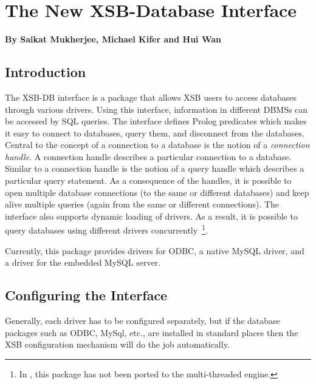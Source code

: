 
\chapter{The New XSB-Database Interface} \label{db_interface}

\begin{center}
{\Large {\bf By Saikat Mukherjee, Michael Kifer and Hui Wan }}
\end{center}

\section{Introduction}

The XSB-DB interface is a package that allows XSB users to access
databases through various drivers. Using this interface, information
in different DBMSs can be accessed by SQL queries. The interface
defines Prolog predicates which makes it easy to connect to databases,
query them, and disconnect from the databases. Central to the concept
of a connection to a database is the notion of a \emph{connection handle}.  A
connection handle describes a particular connection to a database.
Similar to a connection handle is the notion of a query handle which
describes a particular query statement. As a consequence of the
handles, it is possible to open multiple database connections (to the
same or different databases) and keep alive multiple queries (again
from the same or different connections). The interface also supports
dynamic loading of drivers. As a result, it is possible to query
databases using different drivers concurrently~\footnote{In
  \version{}, this package has not been ported to the multi-threaded
  engine.}.

Currently, this package provides drivers for ODBC, a native MySQL driver,
and a driver for the embedded MySQL server.

\section{Configuring the Interface}

Generally, each driver has to be configured separately, but if the database
packages such as ODBC, MySql, etc., are installed in standard places then
the XSB configuration mechanism will do the job automatically.

